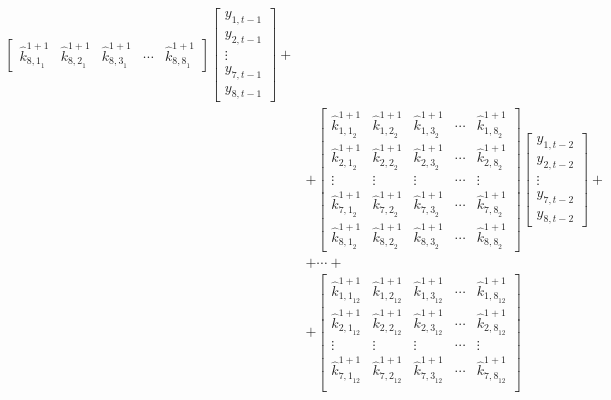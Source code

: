 \documentclass[a4paper,11pt,listof=nochaptergap,oneside,pointednumbers,bibtotoc,bigheadings,liststotoc]{scrbook}
\theoremstyle{mysatz}
\theoremstyle{mydefinition}
\theoremstyle{mybemerkung}
\let\oldhat\hat
\newcommand{\hattnobf}[1]{\oldhat{#1}}
\begin{document}
\begin{itemize}
\begin{enumerate}
\begin{equation}
\begin{split}
\begin{bmatrix}
		{\hattnobf{k}_{{8, 1}_1}^{1+1}} & {\hattnobf{k}_{{8, 2}_1}^{1+1}} & {\hattnobf{k}_{{8, 3}_1}^{1+1}} & \cdots & {\hattnobf{k}_{{8, 8}_1}^{1+1}}
 		\end{bmatrix} 
		\begin{bmatrix}
    		y_{1,t-1} \\
    		y_{2,t-1} \\
		\vdots \\
		y_{7, t-1} \\
		y_{8, t-1}
 		\end{bmatrix} + \\
		& +
		\begin{bmatrix}
    		{\hattnobf{k}_{{1, 1}_2}^{1+1}} & {\hattnobf{k}_{{1, 2}_2}^{1+1}} & {\hattnobf{k}_{{1, 3}_2}^{1+1}} & \cdots & {\hattnobf{k}_{{1, 8}_2}^{1+1}}\\
    		{\hattnobf{k}_{{2, 1}_2}^{1+1}} & {\hattnobf{k}_{{2, 2}_2}^{1+1}} & {\hattnobf{k}_{{2, 3}_2}^{1+1}} & \cdots & {\hattnobf{k}_{{2, 8}_2}^{1+1}}\\
		\vdots & \vdots & \vdots & \cdots & \vdots \\
		{\hattnobf{k}_{{7, 1}_2}^{1+1}} & {\hattnobf{k}_{{7, 2}_2}^{1+1}} & {\hattnobf{k}_{{7, 3}_2}^{1+1}} & \cdots & {\hattnobf{k}_{{7, 8}_2}^{1+1}}\\
		{\hattnobf{k}_{{8, 1}_2}^{1+1}} & {\hattnobf{k}_{{8, 2}_2}^{1+1}} & {\hattnobf{k}_{{8, 3}_2}^{1+1}} & \cdots & {\hattnobf{k}_{{8, 8}_2}^{1+1}}
 		\end{bmatrix} 
		\begin{bmatrix}
    		y_{1,t-2} \\
    		y_{2,t-2} \\
		\vdots \\
		y_{7, t-2} \\
		y_{8, t-2}
 		\end{bmatrix} +\\
		& + \cdots + \\
		& + 
		\begin{bmatrix}
    		{\hattnobf{k}_{{1, 1}_{12}}^{1+1}} & {\hattnobf{k}_{{1, 2}_{12}}^{1+1}} & {\hattnobf{k}_{{1, 3}_{12}}^{1+1}} & \cdots & {\hattnobf{k}_{{1, 8}_{12}}^{1+1}}\\
    		{\hattnobf{k}_{{2, 1}_{12}}^{1+1}} & {\hattnobf{k}_{{2, 2}_{12}}^{1+1}} & {\hattnobf{k}_{{2, 3}_{12}}^{1+1}} & \cdots & {\hattnobf{k}_{{2, 8}_{12}}^{1+1}}\\
		\vdots & \vdots & \vdots & \cdots & \vdots \\
		{\hattnobf{k}_{{7, 1}_{12}}^{1+1}} & {\hattnobf{k}_{{7, 2}_{12}}^{1+1}} & {\hattnobf{k}_{{7, 3}_{12}}^{1+1}} & \cdots & {\hattnobf{k}_{{7, 8}_{12}}^{1+1}}\\

\end{bmatrix}
\end{split}
\end{equation}
\end{enumerate}
\end{itemize}
\end{document}
